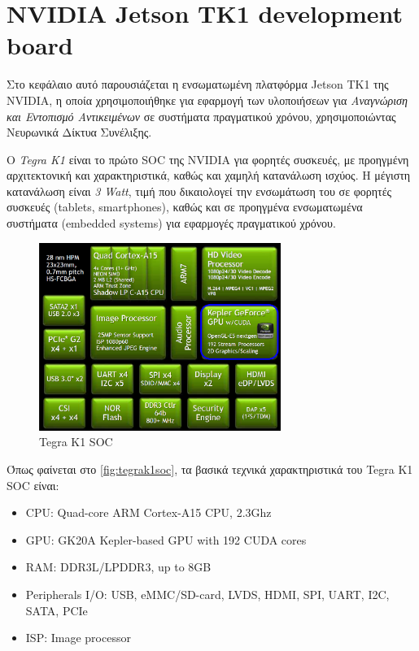 \section{NVIDIA Jetson TK1 development board}
\label{sec:jetson_tk1}

Στο κεφάλαιο αυτό παρουσιάζεται η ενσωματωμένη πλατφόρμα Jetson TK1 της NVIDIA,
η οποία χρησιμοποιήθηκε για εφαρμογή των υλοποιήσεων για
\emph{Αναγνώριση και Εντοπισμό Αντικειμένων} σε συστήματα πραγματικού χρόνου,
χρησιμοποιώντας Νευρωνικά Δίκτυα Συνέλιξης.

Ο \emph{Tegra K1} είναι το πρώτο SOC της NVIDIA για φορητές συσκευές, με προηγμένη αρχιτεκτονική
και χαρακτηριστικά, καθώς και χαμηλή κατανάλωση ισχύος. H μέγιστη κατανάλωση είναι \emph{3 Watt},
τιμή που δικαιολογεί την ενσωμάτωση του σε φορητές συσκευές (tablets, smartphones), καθώς και
σε προηγμένα ενσωματωμένα συστήματα (embedded systems) για εφαρμογές πραγματικού χρόνου.

\begin{figure}[!ht]
  \centering
  \includegraphics[width=0.7\textwidth]{./images/chapter4/nvidia_tegrak1_block2.jpg}
  \caption{Tegra K1 SOC}
  \label{fig:tegrak1soc}
\end{figure}
\noindent

Όπως φαίνεται στο \autoref{fig:tegrak1soc}, τα βασικά τεχνικά χαρακτηριστικά του Tegra K1 SOC είναι:
\begin{itemize}
  \item{CPU: Quad-core ARM Cortex-A15 CPU, 2.3Ghz}
  \item{GPU: GK20A Kepler-based GPU with 192 CUDA cores}
  \item{RAM: DDR3L/LPDDR3, up to 8GB}
  \item{Peripherals I/O: USB, eMMC/SD-card, LVDS, HDMI, SPI, UART, I2C, SATA, PCIe}
  \item{ISP: Image processor}
\end{itemize}

